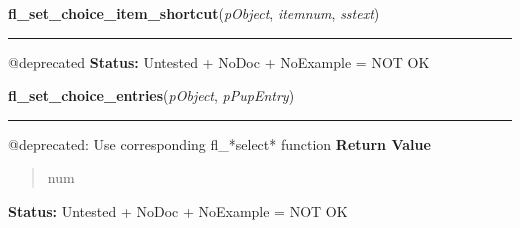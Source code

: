     \label{xformslib:deprecated:fl_set_choice_item_shortcut}

    \vspace{0.5ex}

\hspace{.8\funcindent}\begin{boxedminipage}{\funcwidth}

    \raggedright \textbf{fl\_set\_choice\_item\_shortcut}(\textit{pObject}, \textit{itemnum}, \textit{sstext})

    \vspace{-1.5ex}

    \rule{\textwidth}{0.5\fboxrule}
\setlength{\parskip}{2ex}

@deprecated
\setlength{\parskip}{1ex}
\textbf{Status:} 
Untested + NoDoc + NoExample = NOT OK


    \end{boxedminipage}

    \label{xformslib:deprecated:fl_set_choice_entries}

    \vspace{0.5ex}

\hspace{.8\funcindent}\begin{boxedminipage}{\funcwidth}

    \raggedright \textbf{fl\_set\_choice\_entries}(\textit{pObject}, \textit{pPupEntry})

    \vspace{-1.5ex}

    \rule{\textwidth}{0.5\fboxrule}
\setlength{\parskip}{2ex}

@deprecated: Use corresponding fl\_*select* function
\setlength{\parskip}{1ex}
      \textbf{Return Value}
    \vspace{-1ex}

      \begin{quote}

num
      \end{quote}

\textbf{Status:} 
Untested + NoDoc + NoExample = NOT OK


    \end{boxedminipage}

    \label{xformslib:deprecated:fl_set_choice_notitle}

